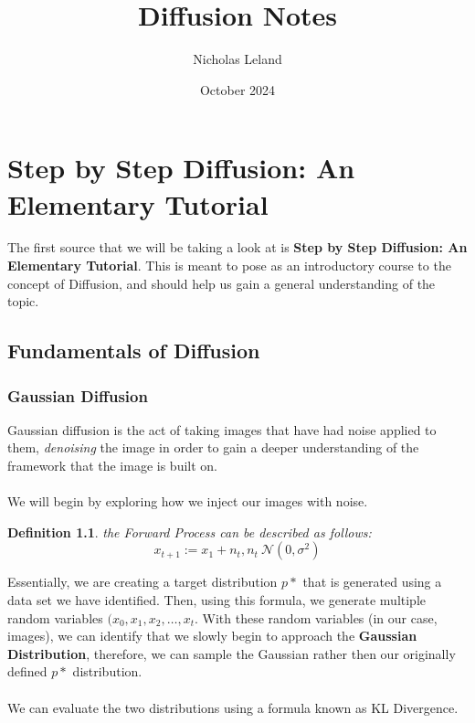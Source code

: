 \documentclass[10pt, oneside]{report}
\title{Diffusion Notes}
\author{Nicholas Leland}
\date{October 2024}
\newtheorem{defn}{Definition}
\begin{document}
\maketitle
\tableofcontents

\vspace{.25in}

\chapter{Step by Step Diffusion: An Elementary Tutorial}
The first source that we will be taking a look at is \textbf{Step by Step Diffusion: An Elementary Tutorial}.  This is meant to pose as an introductory course to the concept of Diffusion, and should help us gain a general understanding of the topic.  

\section{Fundamentals of Diffusion}

\subsection{Gaussian Diffusion}

Gaussian diffusion is the act of taking images that have had noise applied to them, \textit{denoising} the image in order to gain a deeper understanding of the framework that the image is built on. 
\\
\\

We will begin by exploring how we inject our images with noise.  

\begin{defn}
    the {\em Forward Process} can be described as follows: 
    \[
        x_{t+1} := x_1 + n_t,   n_t ~ \mathscr{N}(0, \sigma^2)
    \] 
\end{defn}

Essentially, we are creating a target distribution $p*$ that is generated using a data set we have identified.  Then, using this formula, we generate multiple random variables $(x_0, x_1, x_2, \ldots, x_t$.  With these random variables (in our case, images), we can identify that we slowly begin to approach the \textbf{Gaussian Distribution}, therefore, we can sample the Gaussian rather then our originally defined $p*$ distribution.
\\
\\

We can evaluate the two distributions using a formula known as KL Divergence.
\end{document}
